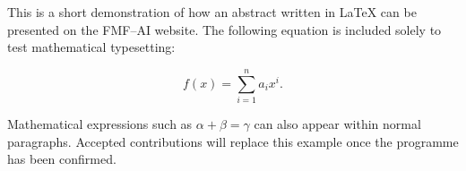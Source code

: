 This is a short demonstration of how an abstract written in \LaTeX{} can be presented on the FMF--AI website. The following equation is included solely to test mathematical typesetting:

\[
  f(x) = \sum_{i=1}^{n} a_i x^i.
\]

Mathematical expressions such as $\alpha + \beta = \gamma$ can also appear within normal paragraphs. Accepted contributions will replace this example once the programme has been confirmed.
